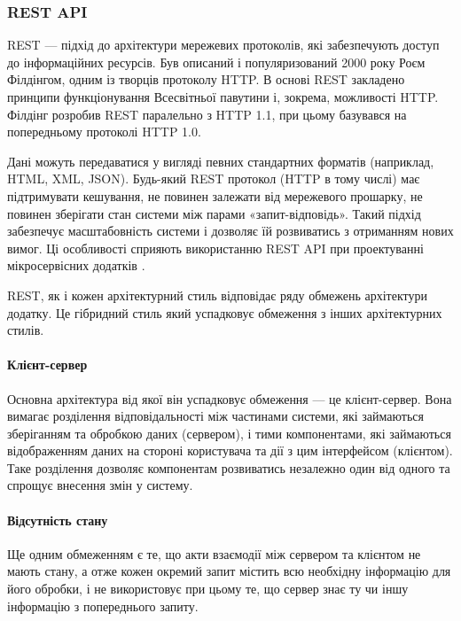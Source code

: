 \subsubsection{REST API}

REST — підхід до архітектури мережевих протоколів, які забезпечують доступ до інформаційних ресурсів. Був описаний і популяризований 2000 року Роєм Філдінгом, одним із творців протоколу HTTP. В основі REST закладено принципи функціонування Всесвітньої павутини і, зокрема, можливості HTTP. Філдінг розробив REST паралельно з HTTP 1.1, при цьому базувався на попередньому протоколі HTTP 1.0.

Дані можуть передаватися у вигляді певних стандартних форматів (наприклад, HTML, XML, JSON). Будь-який REST протокол (HTTP в тому числі) має підтримувати кешування, не повинен залежати від мережевого прошарку, не повинен зберігати стан системи між парами «запит-відповідь». Такий підхід забезпечує масштабовність системи і дозволяє їй розвиватись з отриманням нових вимог. Ці особливості сприяють використанню REST API при проектуванні мікросервісних додатків \cite{кучер2018мікросервісна}.

REST, як і кожен архітектурний стиль відповідає ряду обмежень архітектури додатку. Це гібридний стиль який успадковує обмеження з інших архітектурних стилів.

\paragraph{Клієнт-сервер}

Основна архітектура від якої він успадковує обмеження — це клієнт-сервер. Вона вимагає розділення відповідальності між частинами системи, які займаються зберіганням та обробкою даних (сервером), і тими компонентами, які займаються відображенням даних на стороні користувача та дії з цим інтерфейсом (клієнтом). Таке розділення дозволяє компонентам розвиватись незалежно один від одного та спрощує внесення змін у систему.

\paragraph{Відсутність стану}

Ще одним обмеженням є те, що акти взаємодії між сервером та клієнтом не мають стану, а отже кожен окремий запит містить всю необхідну інформацію для його обробки, і не використовує при цьому те, що сервер знає ту чи іншу інформацію з попереднього запиту.

